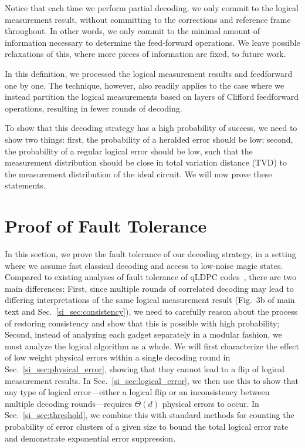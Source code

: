 Notice that each time we perform partial decoding, we only commit to the logical measurement result, without committing to the corrections and reference frame throughout.
%
In other words, we only commit to the minimal amount of information necessary to determine the feed-forward operations.
%
We leave possible relaxations of this, where more pieces of information are fixed, to future work.

In this definition, we processed the logical measurement results and feedforward one by one.
%
The technique, however, also readily applies to the case where we instead partition the logical measurements based on layers of Clifford feedforward operations, resulting in fewer rounds of decoding.

To show that this decoding strategy has a high probability of success, we need to show two things: first, the probability of a heralded error should be low; second, the probability of a regular logical error should be low, such that the measurement distribution should be close in total variation distance (TVD) to the measurement distribution of the ideal circuit.
%
We will now prove these statements.

\section{Proof of Fault Tolerance}
\label{sec:fault_tolerance_proof}

In this section, we prove the fault tolerance of our decoding strategy, in a setting where we assume fast classical decoding and access to low-noise magic states.
%
Compared to existing analyses of fault tolerance of qLDPC codes~\cite{gottesman2013fault}, there are two main differences: First, since multiple rounds of correlated decoding may lead to differing interpretations of the same logical measurement result (Fig.~3b of main text and Sec.~\ref{si_sec:consistency}), we need to carefully reason about the process of restoring consistency and show that this is possible with high probability; Second, instead of analyzing each gadget separately in a modular fashion, we must analyze the logical algorithm as a whole.
%
We will first characterize the effect of low weight physical errors within a single decoding round in Sec.~\ref{si_sec:physical_error}, showing that they cannot lead to a flip of logical measurement results.
%
In Sec.~\ref{si_sec:logical_error}, we then use this to show that any type of logical error---either a logical flip or an inconsistency between multiple decoding rounds---requires $\Theta(d)$ physical errors to occur.
%
In Sec.~\ref{si_sec:threshold}, we combine this with standard methods for counting the probability of error clusters of a given size to bound the total logical error rate and demonstrate exponential error suppression.

